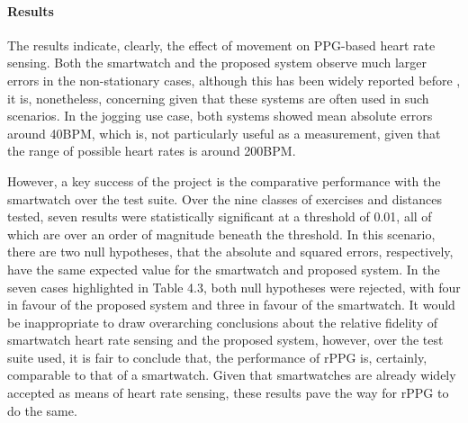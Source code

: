 \paragraph{Results}
The results indicate, clearly, the effect of movement on PPG-based heart rate sensing. Both the smartwatch and the proposed system observe much larger errors in the non-stationary cases, although this has 
been widely reported before \cite{souza2019heart}, it is, nonetheless, concerning given that these systems are often used in such scenarios. In the jogging use case, both systems showed mean absolute errors around 40BPM,
which is, not particularly useful as a measurement, given that the range of possible heart rates is around 200BPM.
\par
However, a key success of the project is the comparative performance with the smartwatch over the test suite. Over the nine classes of exercises and distances tested, seven results were statistically significant at a
threshold of 0.01, all of which are over an order of magnitude beneath the threshold. 
In this scenario, there are two null hypotheses, that the absolute and squared errors, respectively, have the same expected value for the smartwatch and proposed system. 
In the seven cases highlighted in Table 4.3, both null hypotheses were rejected, with four in favour of the proposed system and three in favour of the smartwatch.
It would be inappropriate to draw overarching conclusions about the relative fidelity of smartwatch heart rate sensing and the proposed system, however, over the test suite used, it is fair to conclude 
that, the performance of rPPG is, certainly, comparable to that of a smartwatch. Given that smartwatches are already widely accepted as means of heart rate sensing, these results pave the way for rPPG to do the same.


